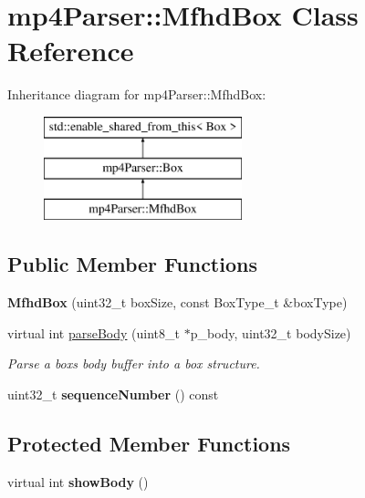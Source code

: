 \hypertarget{classmp4_parser_1_1_mfhd_box}{}\section{mp4\+Parser\+::Mfhd\+Box Class Reference}
\label{classmp4_parser_1_1_mfhd_box}
Inheritance diagram for mp4\+Parser\+::Mfhd\+Box\+:\begin{figure}[H]
\begin{center}
\leavevmode
\includegraphics[height=3.000000cm]{classmp4_parser_1_1_mfhd_box}
\end{center}
\end{figure}
\subsection*{Public Member Functions}
\begin{DoxyCompactItemize}
\item 
\mbox{\label{classmp4_parser_1_1_mfhd_box_a94d66ecad07a604457c82884c6c56595}} 
{\bfseries Mfhd\+Box} (uint32\+\_\+t box\+Size, const Box\+Type\+\_\+t \&box\+Type)
\item 
virtual int \mbox{\hyperlink{classmp4_parser_1_1_mfhd_box_a90ebfbbacfd2a91c158e6b10edc6ed43}{parse\+Body}} (uint8\+\_\+t $\ast$p\+\_\+body, uint32\+\_\+t body\+Size)
\begin{DoxyCompactList}\small\item\em Parse a box\textquotesingle{}s body buffer into a box structure. \end{DoxyCompactList}\item 
\mbox{\label{classmp4_parser_1_1_mfhd_box_a2886138c7785b28d935358b8d78524bc}} 
uint32\+\_\+t {\bfseries sequence\+Number} () const
\end{DoxyCompactItemize}
\subsection*{Protected Member Functions}
\begin{DoxyCompactItemize}
\item 
\mbox{\label{classmp4_parser_1_1_mfhd_box_ad8b03205941bec9a3d82b536cb70e45b}} 
virtual int {\bfseries show\+Body} ()
\end{DoxyCompactItemize}
